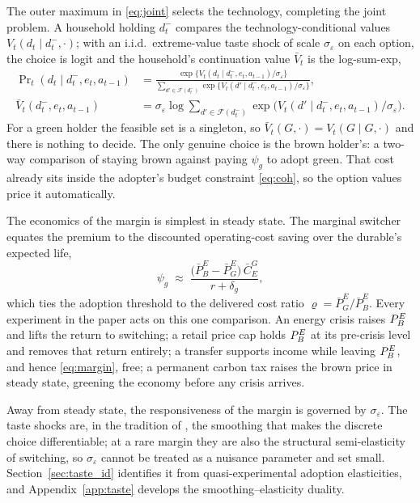 The outer maximum in \eqref{eq:joint} selects the technology, completing the joint
problem. A household holding $d^-_t$ compares the technology-conditional values
$V_t(d_t\mid d^-_t,\cdot)$; with an i.i.d.\ extreme-value taste shock of scale
$\sigma_\varepsilon$ on each option, the choice is logit and the household's
continuation value $\bar V_t$ is the log-sum-exp,
%
\begin{equation}
\begin{aligned}
\Pr\nolimits_t(d_t\mid d^-_t,e_t, a_{t-1})&=
\frac{\exp\{V_t(d_t\mid d^-_t,e_t, a_{t-1})/\sigma_\varepsilon\}}
{\sum_{d'\in\mathcal F(d^-_t)}\exp\{V_t(d'\mid d^-_t,e_t, a_{t-1})/\sigma_\varepsilon\}},\\[4pt]
\bar V_t(d^-_t,e_t, a_{t-1})&=\sigma_\varepsilon\log\!\!\sum_{d'\in\mathcal F(d^-_t)}\!\!
\exp\bigl(V_t(d'\mid d^-_t,e_t, a_{t-1})/\sigma_\varepsilon\bigr).
\end{aligned}
\label{eq:logit}
\end{equation}
%
For a green holder the feasible set is a singleton, so $\bar V_t(G,\cdot)=V_t(G\mid G,\cdot)$
and there is nothing to decide. The only genuine choice is the brown holder's: a
two-way comparison of staying brown against paying $\psi_g$ to adopt green. That cost
already sits inside the adopter's budget constraint \eqref{eq:coh}, so the option values
price it automatically.

The economics of the margin is simplest in steady state. The marginal switcher
equates the premium to the discounted operating-cost saving over the durable's
expected life,
%
\begin{equation}
\psi_g\;\approx\;\frac{\bigl(\bar P^E_B-\bar P^E_G\bigr)\,\bar C^G_E}{r+\delta_g},
\label{eq:margin}
\end{equation}
%
which ties the adoption threshold to the delivered cost ratio
$\varrho=\bar P^E_G/\bar P^E_B$. Every experiment in the paper acts on this one
comparison. An energy crisis raises $P^{E}_{B}$ and lifts the return to switching; a
retail price cap holds $P^{E}_{B}$ at its pre-crisis level and removes that return
entirely; a transfer supports income while leaving $P^{E}_{B}$, and hence
\eqref{eq:margin}, free; a permanent carbon tax raises the brown price in steady
state, greening the economy before any crisis arrives.

Away from steady state, the responsiveness of the margin is governed by
$\sigma_\varepsilon$. The taste shocks are, in the tradition of \citet{iskhakov2017endogenous},
the smoothing that makes the discrete choice differentiable; at a rare margin they are
also the structural semi-elasticity of switching, so $\sigma_\varepsilon$ cannot be
treated as a nuisance parameter and set small. Section~\ref{sec:taste_id} identifies
it from quasi-experimental adoption elasticities, and Appendix~\ref{app:taste}
develops the smoothing--elasticity duality.

